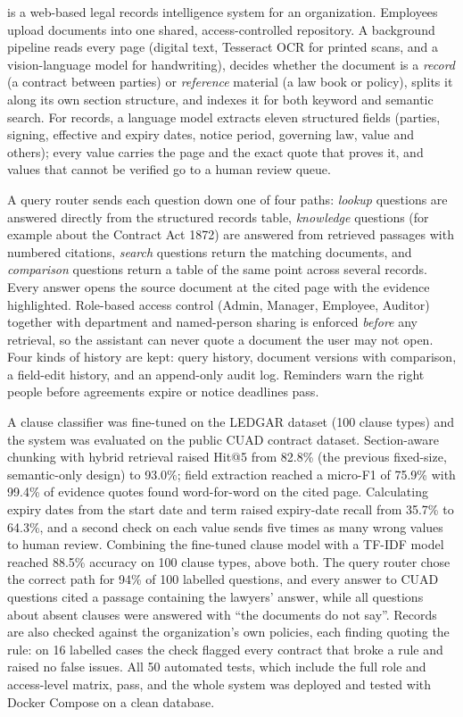 \sysname{} is a web-based legal records intelligence system for an organization. Employees
upload documents into one shared, access-controlled repository. A background pipeline reads every
page (digital text, Tesseract OCR for printed scans, and a vision-language model for handwriting),
decides whether the document is a \emph{record} (a contract between parties) or \emph{reference}
material (a law book or policy), splits it along its own section structure, and indexes it for
both keyword and semantic search. For records, a language model extracts eleven structured fields
(parties, signing, effective and expiry dates, notice period, governing law, value and others); every
value carries the page and the exact quote that proves it, and values that cannot be verified go to a
human review queue.

A query router sends each question down one of four paths: \emph{lookup} questions are answered
directly from the structured records table, \emph{knowledge} questions (for example about the
Contract Act 1872) are answered from retrieved passages with numbered citations,
\emph{search} questions return the matching documents, and \emph{comparison} questions return a table
of the same point across several records. Every answer opens the source document at
the cited page with the evidence highlighted. Role-based access control (Admin, Manager, Employee,
Auditor) together with department and named-person sharing is enforced \emph{before} any
retrieval, so the assistant can never quote a document the user may not open. Four kinds of history
are kept: query history, document versions with comparison, a field-edit history, and an
append-only audit log. Reminders warn the right people before agreements expire or notice
deadlines pass.

A clause classifier was fine-tuned on the LEDGAR dataset (100 clause types) and the system was
evaluated on the public CUAD contract dataset. Section-aware chunking with hybrid retrieval raised
Hit@5 from 82.8\% (the previous fixed-size, semantic-only design) to 93.0\%; field extraction reached a
micro-F1 of 75.9\% with 99.4\% of evidence quotes found word-for-word on the cited page. Calculating expiry dates from the start date and term raised expiry-date recall from 35.7\% to 64.3\%, and a second check on each value sends five times as many wrong values to human review. Combining the fine-tuned clause model with a TF-IDF model reached 88.5\% accuracy on 100 clause types, above both. The query router chose the correct path for 94\% of 100 labelled questions, and every answer to CUAD questions cited a passage containing the lawyers' answer, while all questions about absent clauses were answered with ``the documents do not say''. Records are
also checked against the organization's own policies, each finding quoting the rule: on 16 labelled cases the
check flagged every contract that broke a rule and raised no false issues. All 50
automated tests, which include the full role and access-level matrix, pass, and the whole system was
deployed and tested with Docker Compose on a clean database.

